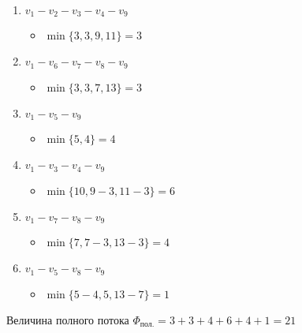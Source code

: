 \documentclass{article}
\begin{document}
\begin{enumerate} 
	\setlength{\itemindent}{3mm}
	\item $v_1 - v_2 - v_3 - v_4 - v_9$
	\begin{itemize}
		\setlength{\itemindent}{3mm}
		\item $\min\{3, 3, 9, 11\} = 3$
	\end{itemize}
	\item $v_1 - v_6 - v_7 - v_8 - v_9$
	\begin{itemize}
		\setlength{\itemindent}{3mm}
		\item $\min\{3, 3, 7, 13\} = 3$
	\end{itemize}
	\item $v_1 - v_5 - v_9$
	\begin{itemize}
		\setlength{\itemindent}{3mm}
		\item $\min\{5, 4\} = 4$
	\end{itemize}
	\item $v_1 - v_3 - v_4 - v_9$
	\begin{itemize}
		\setlength{\itemindent}{3mm}
		\item $\min\{10, 9 - 3, 11 - 3\} = 6$
	\end{itemize}
	\item $v_1 - v_7 - v_8 - v_9$
	\begin{itemize}
		\setlength{\itemindent}{3mm}
		\item $\min\{7, 7-3, 13-3\} = 4$
	\end{itemize}
	\item $v_1 - v_5 - v_8 - v_9$
	\begin{itemize}
		\setlength{\itemindent}{3mm}
		\item $\min\{5-4, 5, 13-7\} = 1$
	\end{itemize}
\end{enumerate}
\par
Величина полного потока $\Phi_{\text{пол.}} = 3 + 3 + 4 + 6 + 4 + 1 = 21$\\\\\
\par
\end{document}

